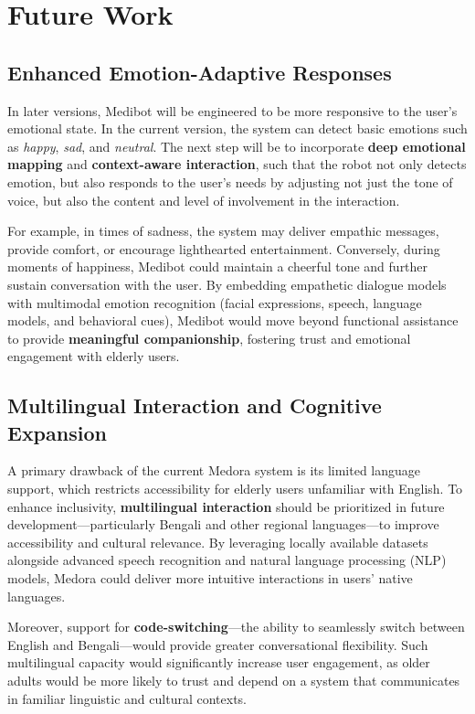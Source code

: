 \section{Future Work}

\subsection{Enhanced Emotion-Adaptive Responses}
In later versions, Medibot will be engineered to be more responsive to the user's emotional state. 
In the current version, the system can detect basic emotions such as \textit{happy}, \textit{sad}, and \textit{neutral}. 
The next step will be to incorporate \textbf{deep emotional mapping} and \textbf{context-aware interaction}, 
such that the robot not only detects emotion, but also responds to the user’s needs by adjusting 
not just the tone of voice, but also the content and level of involvement in the interaction. 

For example, in times of sadness, the system may deliver empathic messages, provide comfort, or 
encourage lighthearted entertainment. Conversely, during moments of happiness, Medibot could 
maintain a cheerful tone and further sustain conversation with the user. By embedding empathetic 
dialogue models with multimodal emotion recognition (facial expressions, speech, language models, 
and behavioral cues), Medibot would move beyond functional assistance to provide \textbf{meaningful 
companionship}, fostering trust and emotional engagement with elderly users. 

\subsection{Multilingual Interaction and Cognitive Expansion}
A primary drawback of the current Medora system is its limited language support, which restricts 
accessibility for elderly users unfamiliar with English. To enhance inclusivity, \textbf{multilingual 
interaction} should be prioritized in future development—particularly Bengali and other regional 
languages—to improve accessibility and cultural relevance. By leveraging locally available datasets 
alongside advanced speech recognition and natural language processing (NLP) models, Medora could 
deliver more intuitive interactions in users’ native languages. 

Moreover, support for \textbf{code-switching}—the ability to seamlessly switch between English and 
Bengali—would provide greater conversational flexibility. Such multilingual capacity would significantly 
increase user engagement, as older adults would be more likely to trust and depend on a system that 
communicates in familiar linguistic and cultural contexts.

